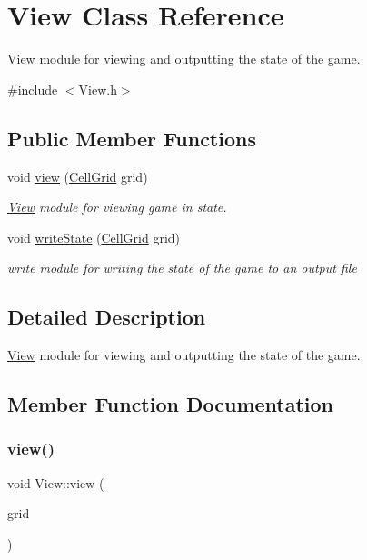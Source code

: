 \hypertarget{class_view}{}\section{View Class Reference}
\label{class_view}


\hyperlink{class_view}{View} module for viewing and outputting the state of the game.  




{\ttfamily \#include $<$View.\+h$>$}

\subsection*{Public Member Functions}
\begin{DoxyCompactItemize}
\item 
void \hyperlink{class_view_a020440a844475ea86dacff7b18706366}{view} (\hyperlink{_cell_grid_8h_a08e01c7715710423d2df780e67d447b4}{Cell\+Grid} grid)
\begin{DoxyCompactList}\small\item\em \hyperlink{class_view}{View} module for viewing game in state. \end{DoxyCompactList}\item 
void \hyperlink{class_view_ab0430cbaaf51bb6dbfff2ddc9fa63323}{write\+State} (\hyperlink{_cell_grid_8h_a08e01c7715710423d2df780e67d447b4}{Cell\+Grid} grid)
\begin{DoxyCompactList}\small\item\em write module for writing the state of the game to an output file \end{DoxyCompactList}\end{DoxyCompactItemize}


\subsection{Detailed Description}
\hyperlink{class_view}{View} module for viewing and outputting the state of the game. 

\subsection{Member Function Documentation}
\mbox{\label{class_view_a020440a844475ea86dacff7b18706366}} 
\subsubsection{\texorpdfstring{view()}{view()}}
{\footnotesize\ttfamily void View\+::view (\begin{DoxyParamCaption}\item[{\hyperlink{_cell_grid_8h_a08e01c7715710423d2df780e67d447b4}{Cell\+Grid}}]{grid }\end{DoxyParamCaption})}



